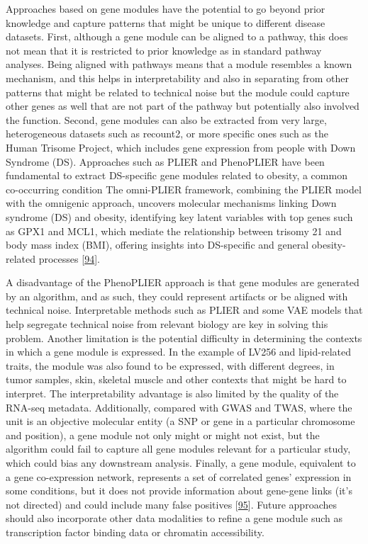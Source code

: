 Approaches based on gene modules have the potential to go beyond prior knowledge and capture patterns that might be unique to different disease datasets.
First, although a gene module can be aligned to a pathway, this does not mean that it is restricted to prior knowledge as in standard pathway analyses.
Being aligned with pathways means that a module resembles a known mechanism, and this helps in interpretability and also in separating from other patterns that might be related to technical noise but the module could capture other genes as well that are not part of the pathway but potentially also involved the function.
Second, gene modules can also be extracted from very large, heterogeneous datasets such as recount2, or more specific ones such as the Human Trisome Project, which includes gene expression from people with Down Syndrome (DS).
Approaches such as PLIER and PhenoPLIER have been fundamental to extract DS-specific gene modules related to obesity, a common co-occurring condition The omni-PLIER framework, combining the PLIER model with the omnigenic approach, uncovers molecular mechanisms linking Down syndrome (DS) and obesity, identifying key latent variables with top genes such as GPX1 and MCL1, which mediate the relationship between trisomy 21 and body mass index (BMI), offering insights into DS-specific and general obesity-related processes {[}\protect\hyperlink{ref-B7FF0NeZ}{94}{]}.

A disadvantage of the PhenoPLIER approach is that gene modules are generated by an algorithm, and as such, they could represent artifacts or be aligned with technical noise.
Interpretable methods such as PLIER and some VAE models that help segregate technical noise from relevant biology are key in solving this problem.
Another limitation is the potential difficulty in determining the contexts in which a gene module is expressed.
In the example of LV256 and lipid-related traits, the module was also found to be expressed, with different degrees, in tumor samples, skin, skeletal muscle and other contexts that might be hard to interpret.
The interpretability advantage is also limited by the quality of the RNA-seq metadata.
Additionally, compared with GWAS and TWAS, where the unit is an objective molecular entity (a SNP or gene in a particular chromosome and position), a gene module not only might or might not exist, but the algorithm could fail to capture all gene modules relevant for a particular study, which could bias any downstream analysis.
Finally, a gene module, equivalent to a gene co-expression network, represents a set of correlated genes' expression in some conditions, but it does not provide information about gene-gene links (it's not directed) and could include many false positives {[}\protect\hyperlink{ref-jVQ2rMqc}{95}{]}.
Future approaches should also incorporate other data modalities to refine a gene module such as transcription factor binding data or chromatin accessibility.

